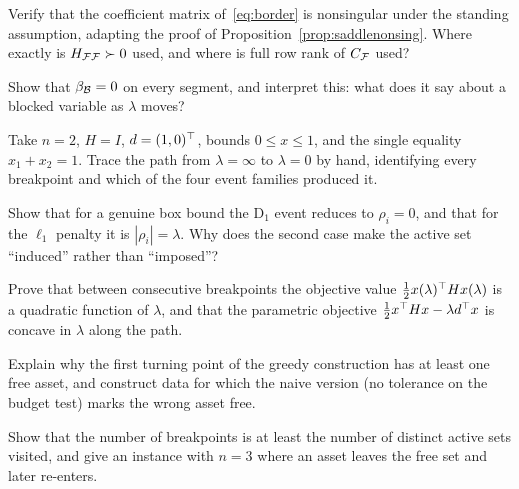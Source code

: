 \begin{exercises}

\begin{exercise}
Verify that the coefficient matrix of~\eqref{eq:border} is nonsingular under the
standing assumption, adapting the proof of Proposition~\ref{prop:saddlenonsing}.
Where exactly is $H_{\mathcal{F}\mathcal{F}} \succ 0$ used, and where is full row rank of
$C_{\mathcal{F}}$ used?
\end{exercise}

\begin{exercise}
Show that $\beta_{\mathcal{B}} = 0$ on every segment, and interpret this: what does it say
about a blocked variable as $\lambda$ moves?
\end{exercise}

\begin{exercise}
Take $n = 2$, $H = I$, $d = (1,0)^{\top}$, bounds $0 \le x \le 1$, and the single equality
$x_1 + x_2 = 1$. Trace the path from $\lambda = \infty$ to $\lambda = 0$ by hand,
identifying every breakpoint and which of the four event families produced it.
\end{exercise}

\begin{exercise}
Show that for a genuine box bound the $\mathrm{D}_1$ event reduces to $\rho_i = 0$,
and that for the $\ell_1$ penalty it is $|\rho_i| = \lambda$. Why does the second
case make the active set ``induced'' rather than ``imposed''?
\end{exercise}

\begin{exercise}
Prove that between consecutive breakpoints the objective value
$\tfrac12 x(\lambda)^{\top} H x(\lambda)$ is a quadratic function of $\lambda$, and that
the parametric objective $\tfrac12 x^{\top} Hx - \lambda d^{\top} x$ is concave in $\lambda$
along the path.
\end{exercise}

\begin{exercise}
Explain why the first turning point of the greedy construction has at least one free
asset, and construct data for which the naive version (no tolerance on the budget
test) marks the wrong asset free.
\end{exercise}

\begin{exercise}
Show that the number of breakpoints is at least the number of distinct active sets
visited, and give an instance with $n = 3$ where an asset leaves the free set and
later re-enters.
\end{exercise}


\end{exercises}

